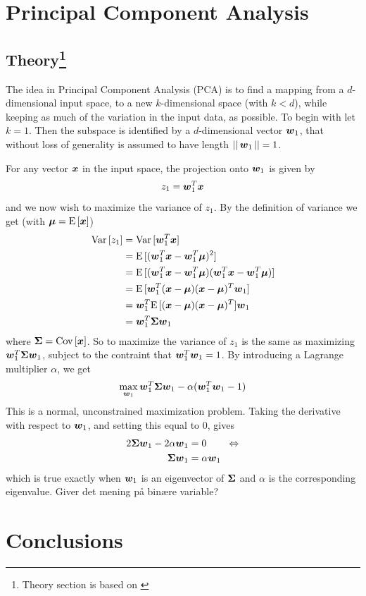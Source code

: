 \section{Principal Component Analysis}

\subsection[Theory]{Theory\protect\footnote{Theory section is based on \citet[p.113]{alpaydin10}}} %
The idea in Principal Component Analysis (PCA) is to find a mapping from a $d$-dimensional input space, to a new $k$-dimensional space (with $k<d$), while keeping as much of the variation in the input data, as possible. To begin with let $k=1$. Then the subspace is identified by a $d$-dimensional vector $\boldsymbol{w}_1$, that without loss of generality is assumed to have length $||\,\boldsymbol{w}_1\,||=1$. \par
For any vector $\boldsymbol{x}$ in the input space, the projection onto $\boldsymbol{w}_1$ is given by
\[
    z_1 = \boldsymbol{w}_1^T \boldsymbol{x}
\]
and we now wish to maximize the variance of $z_1$. By the definition of variance we get (with $\boldsymbol{\mu}=\text{E}\,[\boldsymbol{x}]$)
\begin{align*}
    \text{Var}\,[z_1] &= \text{Var}\,[\boldsymbol{w}_1^T\boldsymbol{x}] \\
    &= \text{E}\,[(\boldsymbol{w}_1^T\boldsymbol{x} - \boldsymbol{w}_1^T\boldsymbol{\mu})^2] \\
    &= \text{E}\,[(\boldsymbol{w}_1^T\boldsymbol{x} - \boldsymbol{w}_1^T\boldsymbol{\mu})(\boldsymbol{w}_1^T\boldsymbol{x} - \boldsymbol{w}_1^T\boldsymbol{\mu})] \\
    &= \text{E}\,[\boldsymbol{w}_1^T(\boldsymbol{x}-\boldsymbol{\mu})(\boldsymbol{x}-\boldsymbol{\mu})^T\boldsymbol{w}_1] \\
    &= \boldsymbol{w}_1^T\text{E}\,[(\boldsymbol{x}-\boldsymbol{\mu})(\boldsymbol{x}-\boldsymbol{\mu})^T]\boldsymbol{w}_1 \\
    &= \boldsymbol{w}_1^T\boldsymbol{\Sigma}\boldsymbol{w}_1
\end{align*}
where $\boldsymbol{\Sigma} = \text{Cov}\,[\boldsymbol{x}]$. So to maximize the variance of $z_1$ is the same as maximizing $\boldsymbol{w}_1^T\boldsymbol{\Sigma}\boldsymbol{w}_1$, subject to the contraint that $\boldsymbol{w}_1^T\boldsymbol{w}_1=1$. By introducing a Lagrange multiplier $\alpha$, we get
\[
    \max_{\boldsymbol{w}_1} \boldsymbol{w}_1^T\boldsymbol{\Sigma}\boldsymbol{w}_1 - \alpha(\boldsymbol{w}_1^T\boldsymbol{w}_1 - 1)
\]
This is a normal, unconstrained maximization problem. Taking the derivative with respect to $\boldsymbol{w}_1$, and setting this equal to 0, gives
\begin{align*}
    2\boldsymbol{\Sigma}\boldsymbol{w}_1 - 2\alpha\boldsymbol{w}_1 &= 0 \quad\quad\Leftrightarrow \\
    \boldsymbol{\Sigma}\boldsymbol{w}_1 &= \alpha\boldsymbol{w}_1
\end{align*}
which is true exactly when $\boldsymbol{w}_1$ is an eigenvector of $\boldsymbol{\Sigma}$ and $\alpha$ is the corresponding eigenvalue.
Giver det mening på binære variable?

\section{Conclusions}

